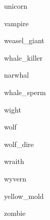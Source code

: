 \documentclass[letterpaper,serif]{module}
\begin{document}
\begin{newmonster}{unicorn}\end{newmonster}

\begin{newmonster}{vampire}\end{newmonster}

\begin{newmonster}{weasel_giant}\end{newmonster}

\begin{newmonster}{whale_killer}\end{newmonster}

\begin{newmonster}{narwhal}\end{newmonster}

\begin{newmonster}{whale_sperm}\end{newmonster}

\begin{newmonster}{wight}\end{newmonster}

\begin{newmonster}{wolf}\end{newmonster}

\begin{newmonster}{wolf_dire}\end{newmonster}

\begin{newmonster}{wraith}\end{newmonster}

\begin{newmonster}{wyvern}\end{newmonster}

\begin{newmonster}{yellow_mold}\end{newmonster}

\begin{newmonster}{zombie}\end{newmonster}

\onecolumn
\end{document}
